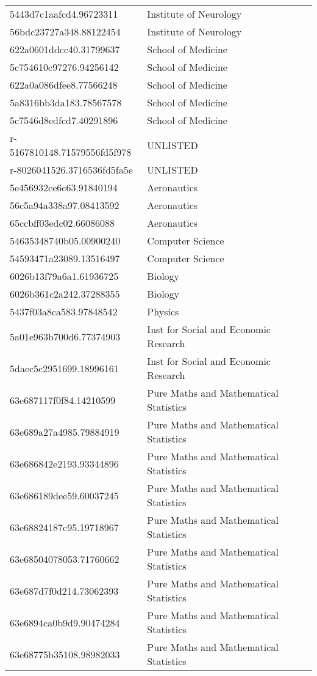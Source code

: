 \begin{tabular}{ll}
5443d7c1aafcd4.96723311 & Institute of Neurology \\
56bdc23727a348.88122454 & Institute of Neurology \\
622a0601ddcc40.31799637 & School of Medicine \\
5c754610c97276.94256142 & School of Medicine \\
622a0a086dfee8.77566248 & School of Medicine \\
5a8316bb3da183.78567578 & School of Medicine \\
5c7546d8edfcd7.40291896 & School of Medicine \\
r-5167810148.71579556fd5f978 & UNLISTED \\
r-8026041526.3716536fd5fa5e & UNLISTED \\
5e456932ce6c63.91840194 & Aeronautics \\
56c5a94a338a97.08413592 & Aeronautics \\
65ccbff03edc02.66086088 & Aeronautics \\
54635348740b05.00900240 & Computer Science \\
54593471a23089.13516497 & Computer Science \\
6026b13f79a6a1.61936725 & Biology \\
6026b361c2a242.37288355 & Biology \\
5437f03a8ca583.97848542 & Physics \\
5a01e963b700d6.77374903 & Inst for Social and Economic Research \\
5daec5c2951699.18996161 & Inst for Social and Economic Research \\
63e687117f0f84.14210599 & Pure Maths and Mathematical Statistics \\
63e689a27a4985.79884919 & Pure Maths and Mathematical Statistics \\
63e686842e2193.93344896 & Pure Maths and Mathematical Statistics \\
63e686189dee59.60037245 & Pure Maths and Mathematical Statistics \\
63e68824187c95.19718967 & Pure Maths and Mathematical Statistics \\
63e68504078053.71760662 & Pure Maths and Mathematical Statistics \\
63e687d7f0d214.73062393 & Pure Maths and Mathematical Statistics \\
63e6894ca0b9d9.90474284 & Pure Maths and Mathematical Statistics \\
63e68775b35108.98982033 & Pure Maths and Mathematical Statistics \\

\end{tabular}
